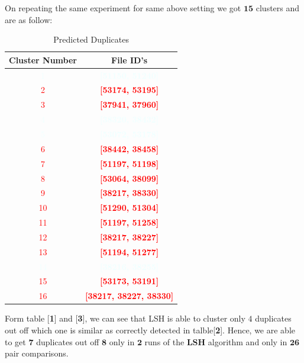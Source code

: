\documentclass[12pt, a4paper,twoside]{article}
\begin{document}
On repeating the same experiment for same  above setting  we got $\bm{15}$ clusters and are as follow:
\begin{table}[H] 
\label{table2}
\begin{center}
\caption{Predicted Duplicates}
\begin{tabular}{|c|c|}
\hline
Cluster Number & File ID's \\
\hline
\textcolor{azure}{1}  & \textcolor{azure}{\textbf{[51150, 51240]}} \\
\textcolor{red}{2}    & \textcolor{red}{\textbf{[53174, 53195]}}   \\
\textcolor{red}{3}    & \textcolor{red}{\textbf{[37941, 37960]}}    \\
\textcolor{azure}{4}  & \textcolor{azure}{\textbf{[38320, 38432]}}   \\
\textcolor{azure}{5}  & \textcolor{azure}{\textbf{[53072, 53178]}}  \\
\textcolor{red}{6}    & \textcolor{red}{\textbf{[38442, 38458]}}     \\
\textcolor{red}{7}    & \textcolor{red}{\textbf{[51197, 51198]}}   \\
\textcolor{red}{8 }   & \textcolor{red}{\textbf{[53064, 38099]}}    \\
\textcolor{red}{9 }   & \textcolor{red}{\textbf{[38217, 38330]}}    \\
\textcolor{red}{10}   & \textcolor{red}{\textbf{[51290, 51304]}}     \\
\textcolor{red}{11}   & \textcolor{red}{\textbf{[51197, 51258]}}     \\
\textcolor{red}{12}   & \textcolor{red}{\textbf{[38217, 38227]}}     \\
\textcolor{red}{13}   & \textcolor{red}{\textbf{[51194, 51277]}}      \\
\textcolor{azure}{14} & \textcolor{azure}{\textbf{[38216, 38255]}}     \\
\textcolor{red}{15}   & \textcolor{red}{\textbf{[53173, 53191]}}        \\
\textcolor{red}{16}   & \textcolor{red}{\textbf{[38217, 38227, 38330]}} \\
\hline
\end{tabular}
\end{center}
\end{table}
Form table [\textbf{1}] and [\textbf{3}], we can see that LSH is able to cluster only $4$ duplicates out off which one is similar as correctly detected in talble[\textbf{2}].
Hence, we are able to get $\bm{7}$ duplicates out off $\bm{8}$  only in $\bm{2}$ runs of the \textbf{LSH} algorithm and only in $\bm{26}$ pair comparisons.
 \begin{singlespacing}
{


}
\end{singlespacing}
\end{document}
